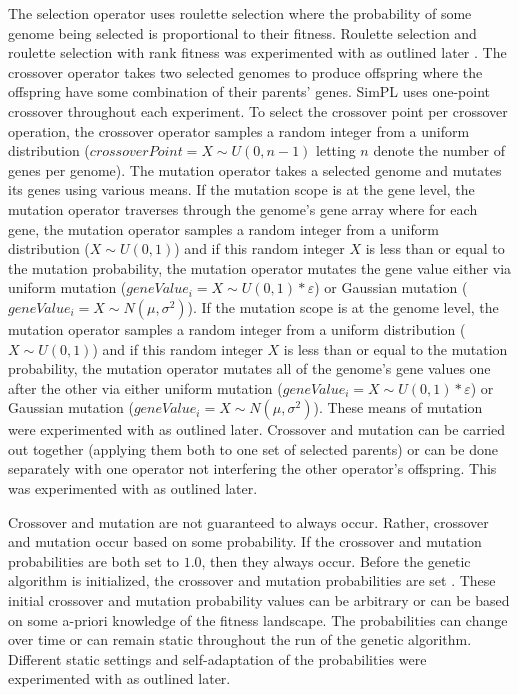 \renewcommand{\baselinestretch}{1.9}

\vspace{3mm}

The selection operator uses roulette selection where the probability of some genome being selected is proportional to their fitness. Roulette selection and roulette selection with rank fitness was experimented with as outlined later \cite{geneticalgorithm}. The crossover operator takes two selected genomes to produce offspring where the offspring have some combination of their parents' genes. SimPL uses one-point crossover throughout each experiment. To select the crossover point per crossover operation, the crossover operator samples a random integer from a uniform distribution ($crossoverPoint = X\!\sim\!U(0,n-1)$ letting $n$ denote the number of genes per genome). The mutation operator takes a selected genome and mutates its genes using various means. If the mutation scope is at the gene level, the mutation operator traverses through the genome's gene array where for each gene, the mutation operator samples a random integer from a uniform distribution ($X\!\sim\!U(0,1)$) and if this random integer $X$ is less than or equal to the mutation probability, the mutation operator mutates the gene value either via uniform mutation ($geneValue_i = X\!\sim\!U(0,1) * \varepsilon$) or Gaussian mutation ($geneValue_i = X\!\sim\!N(\mu,\sigma^2)$). If the mutation scope is at the genome level, the mutation operator samples a random integer from a uniform distribution ($X\sim U(0,1)$) and if this random integer $X$ is less than or equal to the mutation probability, the mutation operator mutates all of the genome's gene values one after the other via either uniform mutation ($geneValue_i = X\!\sim\!U(0,1) * \varepsilon$) or Gaussian mutation ($geneValue_i = X\!\sim\!N(\mu,\sigma^2)$). These means of mutation were experimented with as outlined later. Crossover and mutation can be carried out together (applying them both to one set of selected parents) or can be done separately with one operator not interfering the other operator's offspring. This was experimented with as outlined later.

Crossover and mutation are not guaranteed to always occur. Rather, crossover and mutation occur based on some probability. If the crossover and mutation probabilities are both set to $1.0$, then they always occur. Before the genetic algorithm is initialized, the crossover and mutation probabilities are set \cite{self_adapt}. These initial crossover and mutation probability values can be arbitrary or can be based on some a-priori knowledge of the fitness landscape. The probabilities can change over time or can remain static throughout the run of the genetic algorithm. Different static settings and self-adaptation of the probabilities were experimented with as outlined later. 

